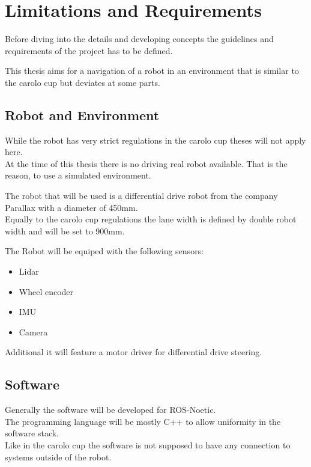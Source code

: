 \chapter{Limitations and Requirements}
\label{Limitations and Requirements}


Before diving into the details and developing concepts the guidelines and requirements of the project has to be defined.

This thesis aims for a navigation of a robot in an environment that is similar to the carolo cup but deviates at some parts.

\section{Robot and Environment}
While the robot has very strict regulations in the carolo cup theses will not apply here.\\

At the time of this thesis there is no driving real robot available. That is the reason, to use a simulated environment.

The robot that will be used is a differential drive robot from the company Parallax with a diameter of 450mm.\\

Equally to the carolo cup regulations the lane width is defined by double robot width and will be set to 900mm. 

The Robot will be equiped with the following sensors:

\begin{itemize}
	\item Lidar
	\item Wheel encoder
	\item IMU
	\item Camera
\end{itemize}

Additional it will feature a motor driver for differential drive steering.

\section{Software}
Generally the software will be developed for ROS-Noetic.\\
The programming language will be mostly C++ to allow uniformity in the software stack.\\
Like in the carolo cup the software is not supposed to have any connection to systems outside of the robot.\\

